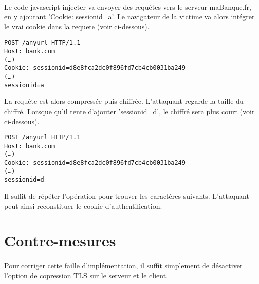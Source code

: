 \paragraph{}
Le code javascript injecter va envoyer des requêtes vers le serveur maBanque.fr, en y ajoutant 'Cookie: sessionid=a'. Le navigateur de la victime va alors intégrer le vrai cookie dans la requete (voir ci-dessous).


\begin{verbatim}
POST /anyurl HTTP/1.1
Host: bank.com
(…)
Cookie: sessionid=d8e8fca2dc0f896fd7cb4cb0031ba249
(…)
sessionid=a
\end{verbatim}


La requête est alors compressée puis chiffrée. L'attaquant regarde la taille du chiffré.
Lorsque qu'il tente d'ajouter 'sessionid=d', le chiffré sera plus court (voir ci-dessous). 


\begin{verbatim}
POST /anyurl HTTP/1.1
Host: bank.com
(…)
Cookie: sessionid=d8e8fca2dc0f896fd7cb4cb0031ba249
(…)
sessionid=d
\end{verbatim}

Il suffit de répéter l'opération pour trouver les caractères suivants. L'attaquant peut ainsi reconstituer le cookie d'authentification.

\section{Contre-mesures}
\paragraph{}
Pour corriger cette faille d'implémentation, il suffit simplement de désactiver l'option de copression TLS sur le serveur et le client.
